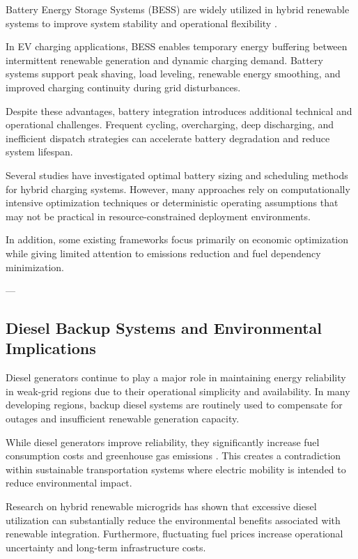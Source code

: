 Battery Energy Storage Systems (BESS) are widely utilized in hybrid renewable systems to improve system stability and operational flexibility \cite{bess_hybrid_systems}.

In EV charging applications, BESS enables temporary energy buffering between intermittent renewable generation and dynamic charging demand. Battery systems support peak shaving, load leveling, renewable energy smoothing, and improved charging continuity during grid disturbances.

Despite these advantages, battery integration introduces additional technical and operational challenges. Frequent cycling, overcharging, deep discharging, and inefficient dispatch strategies can accelerate battery degradation and reduce system lifespan.

Several studies have investigated optimal battery sizing and scheduling methods for hybrid charging systems. However, many approaches rely on computationally intensive optimization techniques or deterministic operating assumptions that may not be practical in resource-constrained deployment environments.

In addition, some existing frameworks focus primarily on economic optimization while giving limited attention to emissions reduction and fuel dependency minimization.

---

\subsection{Diesel Backup Systems and Environmental Implications}

Diesel generators continue to play a major role in maintaining energy reliability in weak-grid regions due to their operational simplicity and availability. In many developing regions, backup diesel systems are routinely used to compensate for outages and insufficient renewable generation capacity.

While diesel generators improve reliability, they significantly increase fuel consumption costs and greenhouse gas emissions \cite{diesel_microgrid_emissions}. This creates a contradiction within sustainable transportation systems where electric mobility is intended to reduce environmental impact.

Research on hybrid renewable microgrids has shown that excessive diesel utilization can substantially reduce the environmental benefits associated with renewable integration. Furthermore, fluctuating fuel prices increase operational uncertainty and long-term infrastructure costs.

